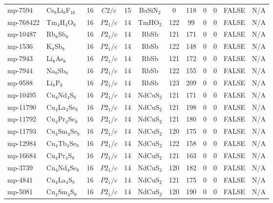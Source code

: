 {\begin{longtable}{llcccccccccc}
    mp-7594 & Cs$_{8}$Li$_{8}$F$_{16}$ & 16    & $C2/c$ & 15    & BaSiN$_{2}$ & 0     & 118   & 0     & 0     & FALSE & N/A \\
    mp-768422 & Tm$_{4}$H$_{4}$O$_{8}$ & 16    & $P2_1/c$ & 14    & TmHO$_{2}$ & 122   & 99    & 0     & 0     & FALSE & N/A \\
    mp-10487 & Rb$_{8}$Sb$_{8}$ & 16    & $P2_1/c$ & 14    & RbSb  & 121   & 171   & 0     & 0     & FALSE & N/A \\
    mp-1536 & K$_{8}$Sb$_{8}$ & 16    & $P2_1/c$ & 14    & RbSb  & 122   & 148   & 0     & 0     & FALSE & N/A \\
    mp-7943 & Li$_{8}$As$_{8}$ & 16    & $P2_1/c$ & 14    & RbSb  & 121   & 172   & 0     & 0     & FALSE & N/A \\
    mp-7944 & Na$_{8}$Sb$_{8}$ & 16    & $P2_1/c$ & 14    & RbSb  & 122   & 155   & 0     & 0     & FALSE & N/A \\
    mp-9588 & Li$_{8}$P$_{8}$ & 16    & $P2_1/c$ & 14    & RbSb  & 123   & 209   & 0     & 0     & FALSE & N/A \\
    mp-10495 & Cu$_{4}$Nd$_{4}$S$_{8}$ & 16    & $P2_1/c$ & 14    & NdCuS$_{2}$ & 121   & 171   & 0     & 0     & FALSE & N/A \\
    mp-11790 & Cu$_{4}$La$_{4}$Se$_{8}$ & 16    & $P2_1/c$ & 14    & NdCuS$_{2}$ & 121   & 198   & 0     & 0     & FALSE & N/A \\
    mp-11792 & Cu$_{4}$Pr$_{4}$Se$_{8}$ & 16    & $P2_1/c$ & 14    & NdCuS$_{2}$ & 121   & 180   & 0     & 0     & FALSE & N/A \\
    mp-11793 & Cu$_{4}$Sm$_{4}$Se$_{8}$ & 16    & $P2_1/c$ & 14    & NdCuS$_{2}$ & 120   & 175   & 0     & 0     & FALSE & N/A \\
    mp-12984 & Cu$_{4}$Tb$_{4}$Se$_{8}$ & 16    & $P2_1/c$ & 14    & NdCuS$_{2}$ & 122   & 158   & 0     & 0     & FALSE & N/A \\
    mp-16684 & Cu$_{4}$Pr$_{4}$S$_{8}$ & 16    & $P2_1/c$ & 14    & NdCuS$_{2}$ & 121   & 163   & 0     & 0     & FALSE & N/A \\
    mp-3739 & Cu$_{4}$Nd$_{4}$Se$_{8}$ & 16    & $P2_1/c$ & 14    & NdCuS$_{2}$ & 120   & 182   & 0     & 0     & FALSE & N/A \\
    mp-4841 & Cu$_{4}$La$_{4}$S$_{8}$ & 16    & $P2_1/c$ & 14    & NdCuS$_{2}$ & 121   & 175   & 0     & 0     & FALSE & N/A \\
    mp-5081 & Cu$_{4}$Sm$_{4}$S$_{8}$ & 16    & $P2_1/c$ & 14    & NdCuS$_{2}$ & 120   & 190   & 0     & 0     & FALSE & N/A \\

\end{longtable}}
